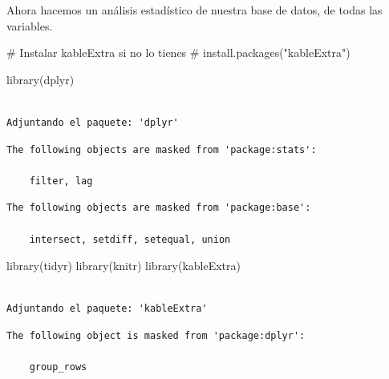 \documentclass[
  letterpaper,
  DIV=11,
  numbers=noendperiod]{scrreprt}
\newenvironment{Shaded}{\begin{snugshade}}{\end{snugshade}}
\newcommand{\CommentTok}[1]{\textcolor[rgb]{0.37,0.37,0.37}{#1}}
\newcommand{\FunctionTok}[1]{\textcolor[rgb]{0.28,0.35,0.67}{#1}}
\newcommand{\NormalTok}[1]{\textcolor[rgb]{0.00,0.23,0.31}{#1}}
\begin{document}
Ahora hacemos un análisis estadístico de nuestra base de datos, de todas
las variables.

\begin{Shaded}
\begin{Highlighting}[]
\CommentTok{\# Instalar kableExtra si no lo tienes}
\CommentTok{\# install.packages("kableExtra") }

\FunctionTok{library}\NormalTok{(dplyr)}
\end{Highlighting}
\end{Shaded}

\begin{verbatim}

Adjuntando el paquete: 'dplyr'
\end{verbatim}

\begin{verbatim}
The following objects are masked from 'package:stats':

    filter, lag
\end{verbatim}

\begin{verbatim}
The following objects are masked from 'package:base':

    intersect, setdiff, setequal, union
\end{verbatim}

\begin{Shaded}
\begin{Highlighting}[]
\FunctionTok{library}\NormalTok{(tidyr)}
\FunctionTok{library}\NormalTok{(knitr)}
\FunctionTok{library}\NormalTok{(kableExtra)}
\end{Highlighting}
\end{Shaded}

\begin{verbatim}

Adjuntando el paquete: 'kableExtra'
\end{verbatim}

\begin{verbatim}
The following object is masked from 'package:dplyr':

    group_rows
\end{verbatim}
\end{document}
